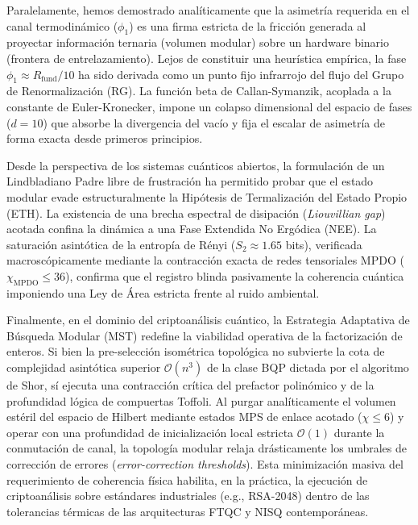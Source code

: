 \documentclass[12pt,a4paper]{article}
\theoremstyle{plain}
\theoremstyle{definition}
\theoremstyle{remark}
\begin{document}
Paralelamente, hemos demostrado analíticamente que la asimetría requerida en el canal termodinámico ($\phi_1$) es una firma estricta de la fricción generada al proyectar información ternaria (volumen modular) sobre un hardware binario (frontera de entrelazamiento). Lejos de constituir una heurística empírica, la fase $\phi_1 \approx R_{\text{fund}}/10$ ha sido derivada como un punto fijo infrarrojo del flujo del Grupo de Renormalización (RG). La función beta de Callan-Symanzik, acoplada a la constante de Euler-Kronecker, impone un colapso dimensional del espacio de fases ($d=10$) que absorbe la divergencia del vacío y fija el escalar de asimetría de forma exacta desde primeros principios.

Desde la perspectiva de los sistemas cuánticos abiertos, la formulación de un Lindbladiano Padre libre de frustración ha permitido probar que el estado modular evade estructuralmente la Hipótesis de Termalización del Estado Propio (ETH). La existencia de una brecha espectral de disipación (\textit{Liouvillian gap}) acotada confina la dinámica a una Fase Extendida No Ergódica (NEE). La saturación asintótica de la entropía de Rényi ($S_2 \approx 1.65$ bits), verificada macroscópicamente mediante la contracción exacta de redes tensoriales MPDO ($\chi_{\text{MPDO}} \le 36$), confirma que el registro blinda pasivamente la coherencia cuántica imponiendo una Ley de Área estricta frente al ruido ambiental.

Finalmente, en el dominio del criptoanálisis cuántico, la Estrategia Adaptativa de Búsqueda Modular (MST) redefine la viabilidad operativa de la factorización de enteros. Si bien la pre-selección isométrica topológica no subvierte la cota de complejidad asintótica superior $\mathcal{O}(n^3)$ de la clase BQP dictada por el algoritmo de Shor, sí ejecuta una contracción crítica del prefactor polinómico y de la profundidad lógica de compuertas Toffoli. Al purgar analíticamente el volumen estéril del espacio de Hilbert mediante estados MPS de enlace acotado ($\chi \le 6$) y operar con una profundidad de inicialización local estricta $\mathcal{O}(1)$ durante la conmutación de canal, la topología modular relaja drásticamente los umbrales de corrección de errores (\textit{error-correction thresholds}). Esta minimización masiva del requerimiento de coherencia física habilita, en la práctica, la ejecución de criptoanálisis sobre estándares industriales (e.g., RSA-2048) dentro de las tolerancias térmicas de las arquitecturas FTQC y NISQ contemporáneas.
\end{document}
